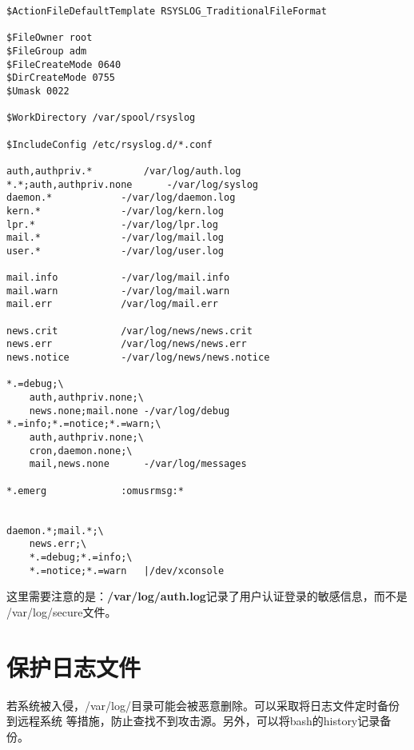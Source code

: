 \begin{Verbatim}[]
$ActionFileDefaultTemplate RSYSLOG_TraditionalFileFormat

$FileOwner root
$FileGroup adm
$FileCreateMode 0640
$DirCreateMode 0755
$Umask 0022

$WorkDirectory /var/spool/rsyslog

$IncludeConfig /etc/rsyslog.d/*.conf

auth,authpriv.*			/var/log/auth.log
*.*;auth,authpriv.none		-/var/log/syslog
daemon.*			-/var/log/daemon.log
kern.*				-/var/log/kern.log
lpr.*				-/var/log/lpr.log
mail.*				-/var/log/mail.log
user.*				-/var/log/user.log

mail.info			-/var/log/mail.info
mail.warn			-/var/log/mail.warn
mail.err			/var/log/mail.err

news.crit			/var/log/news/news.crit
news.err			/var/log/news/news.err
news.notice			-/var/log/news/news.notice

*.=debug;\
	auth,authpriv.none;\
	news.none;mail.none	-/var/log/debug
*.=info;*.=notice;*.=warn;\
	auth,authpriv.none;\
	cron,daemon.none;\
	mail,news.none		-/var/log/messages

*.emerg				:omusrmsg:*


daemon.*;mail.*;\
	news.err;\
	*.=debug;*.=info;\
	*.=notice;*.=warn	|/dev/xconsole
\end{Verbatim}

这里需要注意的是：\textbf{/var/log/auth.log}记录了用户认证登录的敏感信息，而不是%
/var/log/secure文件。


\section{保护日志文件}
若系统被入侵，/var/log/目录可能会被恶意删除。可以采取将日志文件定时备份到远程系统%
等措施，防止查找不到攻击源。另外，可以将bash的history记录备份。
